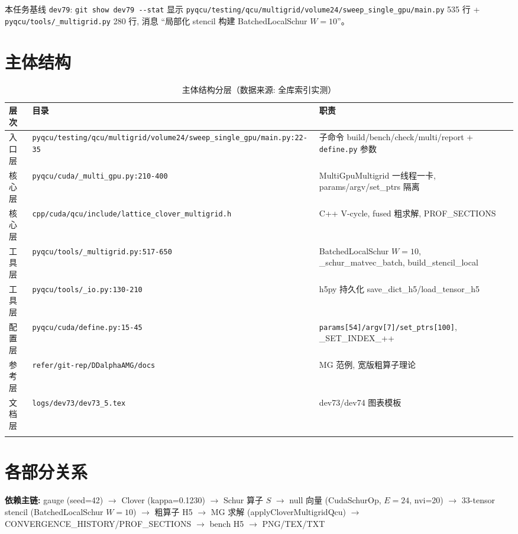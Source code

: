 \documentclass[UTF8]{ctexart}
\begin{document}
\noindent 本任务基线 \texttt{\nolinkurl{dev79}}: \texttt{\nolinkurl{git show dev79 --stat}} 显示 \texttt{\nolinkurl{pyqcu/testing/qcu/multigrid/volume24/sweep_single_gpu/main.py}} 535 行 + \texttt{\nolinkurl{pyqcu/tools/_multigrid.py}} 280 行, 消息 ``局部化 stencil 构建 BatchedLocalSchur $W=10$''。

\section{主体结构}
\begin{xltabular}{\textwidth}{llX}
\toprule
\textcolor{struct}{层次} & 目录 & \textcolor{struct}{职责} \\
\midrule
\endhead
入口层 & \texttt{\nolinkurl{pyqcu/testing/qcu/multigrid/volume24/sweep_single_gpu/main.py:22-35}} & 子命令 build/bench/check/multi/report + \texttt{\nolinkurl{define.py}} 参数 \\
核心层 & \texttt{\nolinkurl{pyqcu/cuda/_multi_gpu.py:210-400}} & MultiGpuMultigrid 一线程一卡, params/argv/set\_ptrs 隔离 \\
核心层 & \texttt{\nolinkurl{cpp/cuda/qcu/include/lattice_clover_multigrid.h}} & C++ V-cycle, fused 粗求解, PROF\_SECTIONS \\
工具层 & \texttt{\nolinkurl{pyqcu/tools/_multigrid.py:517-650}} & BatchedLocalSchur $W=10$, \_schur\_matvec\_batch, build\_stencil\_local \\
工具层 & \texttt{\nolinkurl{pyqcu/tools/_io.py:130-210}} & h5py 持久化 save\_dict\_h5/load\_tensor\_h5 \\
配置层 & \texttt{\nolinkurl{pyqcu/cuda/define.py:15-45}} & \texttt{\nolinkurl{params[54]/argv[7]/set_ptrs[100]}}, \_SET\_INDEX\_++ \\
参考层 & \texttt{\nolinkurl{refer/git-rep/DDalphaAMG/docs}} & MG 范例, 宽版粗算子理论 \\
文档层 & \texttt{\nolinkurl{logs/dev73/dev73_5.tex}} & dev73/dev74 图表模板 \\
\bottomrule
\caption{主体结构分层（数据来源: 全库索引实测）}
\end{xltabular}

\section{各部分关系}
\begin{keybox}
\textbf{依赖主链:} \textcolor{relation}{gauge (seed=42) $\to$ Clover (kappa=0.1230) $\to$ Schur 算子 $S$ $\to$ null 向量 (CudaSchurOp, $E=24$, nvi=20) $\to$ 33-tensor stencil (BatchedLocalSchur $W=10$) $\to$ 粗算子 H5 $\to$ MG 求解 (applyCloverMultigridQcu) $\to$ CONVERGENCE\_HISTORY/PROF\_SECTIONS $\to$ bench H5 $\to$ PNG/TEX/TXT}
\end{keybox}
\end{document}
